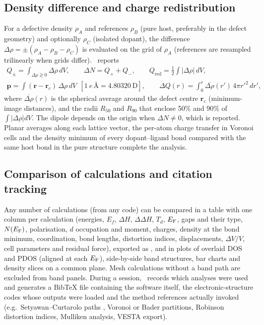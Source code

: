 \subsection{Density difference and charge redistribution}
For a defective density $\rho_A$ and references $\rho_B$ (pure host, preferably in the defect geometry) and optionally $\rho_C$ (isolated dopant), the difference $\Delta\rho=\pm(\rho_A-\rho_B-\rho_C)$ is evaluated on the grid of $\rho_A$ (references are resampled trilinearly when grids differ). \BMR\ reports
\begin{gather}
Q_\pm=\int_{\Delta\rho\gtrless0}\Delta\rho\,dV,\qquad \Delta N=Q_++Q_-,\qquad Q_\mathrm{red}=\tfrac12\int|\Delta\rho|\,dV,\\
\mathbf p=\int(\mathbf r-\mathbf r_c)\,\Delta\rho\,dV\ \ [1\ e\,\text{\AA}=4.80320\ \mathrm D],\qquad
\Delta Q(r)=\int_0^{r}\overline{\Delta\rho}(r')\,4\pi r'^2\,dr',
\end{gather}
where $\overline{\Delta\rho}(r)$ is the spherical average around the defect centre $\mathbf r_c$ (minimum-image distances), and the radii $R_{50}$ and $R_{90}$ that enclose 50\% and 90\% of $\int|\Delta\rho|dV$. The dipole depends on the origin when $\Delta N\neq0$, which is reported. Planar averages along each lattice vector, the per-atom charge transfer in Voronoi cells and the density minimum of every dopant–ligand bond compared with the same host bond in the pure structure complete the analysis.

\subsection{Comparison of calculations and citation tracking}
Any number of calculations (from any code) can be compared in a table with one column per calculation (energies, $E_f$, $\Delta H$, $\Delta\Delta H$, $T_d$, $E_\mathrm{F}$, gaps and their type, $N(E_\mathrm{F})$, polarisation, $d$ occupation and moment, charges, density at the bond minimum, coordination, bond lengths, distortion indices, displacements, $\Delta V/V$, cell parameters and residual force), exported as , and in plots of overlaid DOS and PDOS (aligned at each $E_\mathrm{F}$), side-by-side band structures, bar charts and density slices on a common plane. Mesh calculations without a band path are excluded from band panels. During a session, \BMR\ records which analyses were used and generates a BibTeX file containing the software itself, the electronic-structure codes whose outputs were loaded and the method references actually invoked (e.g.\ Setyawan–Curtarolo paths \cite{setyawan2010}, Voronoi or Bader partitions, Robinson distortion indices, Mulliken analysis, VESTA export).

